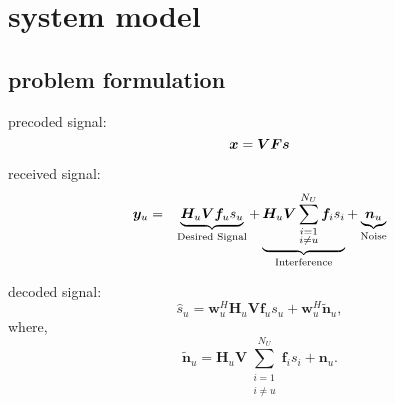 \documentclass[conference]{IEEEtran}
\begin{document}

\section{system model}


\subsection{problem formulation}

precoded signal:
\begin{equation}{\label{eq:transx1}}
{\bm x} = \bm{V}\bm{F}\bm{s}
\end{equation}


received signal:
\begin{eqnarray}{\label{eq:rewrite}}
{\bm y}_{u} &=&\underbrace{\bm{H}_{u} \bm{V}\bm{f}_{u}{s}_{u}}_\text{Desired Signal}+\underbrace{\bm{H}_{u} \bm{V}\sum_{\substack{i=1 \\ i\neq u}}^{N_U}\bm{f}_{i}s_{i}}_\text{Interference}+\underbrace{\bm{n}_{u}}_\text{Noise}
\end{eqnarray}

decoded signal:
\begin{equation}
\hat{s}_{u} = \bm{w}_{u}^H \bm{H}_{u} \bm{V} \bm{f}_{u} s_{u} + \bm{w}_{u}^H \bm{\tilde{n}}_{u},
\end{equation}
where,
\begin{equation}
\bm{\tilde{n}}_u=\bm{H}_{u} \bm{V}\sum_{\substack{i=1 \\ i\neq u}}^{N_U}\bm{f}_{i}s_{i} + \bm{n}_{u}.
\end{equation}
\end{document}
